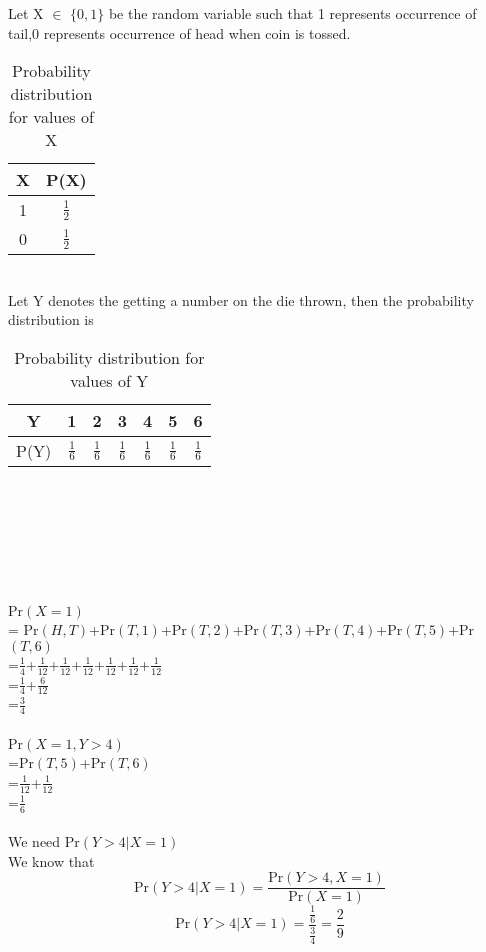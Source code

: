 \documentclass[journal,12pt,twocolumn]{IEEEtran}
\begin{document}
Let X $\in$ $\{0,1\}$ be the random variable such that 1 represents occurrence of tail,0 represents occurrence of head when coin is tossed.
\begin{table}[ht]
\caption{Probability distribution for values of X}
\begin{center}
    \begin{tabular}{|c|c|}
    \hline
    X & P(X)\\
    \hline
    1 & $\frac{1}{2}$ \\
    \hline
    0 & $\frac{1}{2}$\\
    \hline
    \end{tabular}
\end{center} 
\end{table}
\\Let Y denotes the getting a number on the die thrown, then the probability distribution is
\begin{table}[ht]
\caption{Probability distribution for values of Y}
\begin{center}
    \begin{tabular}{|c|c|c|c|c|c|c|}
    \hline
    Y & 1 & 2 & 3 & 4 & 5 & 6 \\
    \hline
    P(Y) & $\frac{1}{6}$ & $\frac{1}{6}$ & $\frac{1}{6}$ & $\frac{1}{6}$ & $\frac{1}{6}$ & $\frac{1}{6}$  \\
    \hline
    \end{tabular}
\end{center} 
\end{table}
\\\\\\\\\\\\
Pr$(X=1)$\\
= Pr$(H,T)$+Pr$(T,1)$+Pr$(T,2)$+Pr$(T,3)$+Pr$(T,4)$+Pr$(T,5)$+Pr$(T,6)$ \\ 
=$\frac{1}{4}$+$\frac{1}{12}$+$\frac{1}{12}$+$\frac{1}{12}$+$\frac{1}{12}$+$\frac{1}{12}$+$\frac{1}{12}$\\
=$\frac{1}{4}$+$\frac{6}{12}$\\
=$\frac{3}{4}$\\\\
Pr$(X=1,Y>4)$\\
=Pr$(T,5)$+Pr$(T,6)$\\
=$\frac{1}{12}$+$\frac{1}{12}$\\
=$\frac{1}{6}$\\\\
We need Pr$(Y>4|X=1)$\\
We know that
\begin{equation}
   \text{Pr}(Y>4|X=1)= \frac{\text{Pr}(Y>4,X=1)}{\text{Pr}(X=1)} 
\end{equation}
\begin{equation}
  \text{Pr}(Y>4|X=1)= \frac{\frac{1}{6}}{\frac{3}{4}}=\frac{2}{9}
\end{equation}
\therefore {} \\\\
\end{document}
